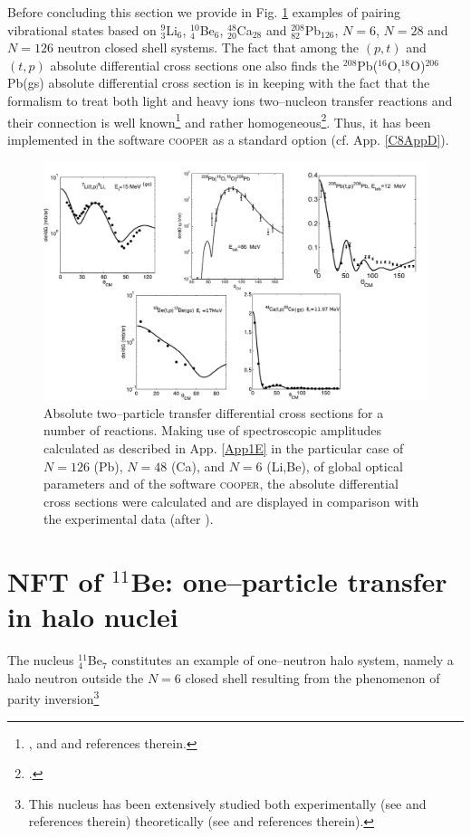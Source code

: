  
 Before concluding this section we provide in Fig. \ref{fig8_2_1} examples of pairing vibrational states based on $^9_3$Li$_6$, $^{10}_4$Be$_6$, $^{48}_{20}$Ca$_{28}$ and $^{208}_{82}$Pb$_{126}$, $N=6$, $N=28$ and $N=126$ neutron closed shell systems. The fact that among the $(p,t)$ and $(t,p)$ absolute differential cross sections one also finds the $^{208}$Pb($^{16}$O,$^{18}$O)$^{206}$Pb(gs) absolute differential cross section is in keeping with the fact that the formalism to treat both light and heavy ions two--nucleon transfer reactions and their connection is well known\footnote{\cite{Broglia:04a}, \cite{Bayman:82} and  \cite{Thompson:88} and references therein.} and rather homogeneous\footnote{\cite{Potel:13b}.}. Thus, it has been implemented in the software \textsc{cooper} as a standard option (cf. App. \ref{C8AppD}).
   \begin{figure}
   \centerline{\includegraphics*[width=12cm,angle=0]{C8/figsC8/fig8_1_5}}
   	\caption{Absolute two--particle transfer differential cross sections for a number of reactions. Making use of spectroscopic amplitudes calculated as described in App. \ref{App1E} in the particular case of $N=126$ (Pb), $N=48$ (Ca), and $N=6$ (Li,Be), of global optical parameters and of the software \textsc{cooper}, the absolute differential cross sections were calculated and are displayed in comparison with the experimental data (after \cite{Potel:13}).}\label{fig8_2_1}
   \end{figure}
 
 
 
 
 
 
 
 
\section{NFT of $^{11}$Be: one--particle transfer in halo nuclei}\label{C6S2}
 The nucleus $^{11}_4$Be$_7$ constitutes an example of one--neutron halo system, namely a halo neutron outside the $N=6$ closed shell resulting from the phenomenon of parity inversion\footnote{This nucleus has been extensively studied both experimentally (see \cite{Iwasaki:00,Fortier:99,Winfield:01,Auton:70,Zwieglinski:79,Schmitt:13,Nortershauser:09,Kwan:14}  and references therein) theoretically (see \cite{Talmi:60,Otsuka:93,Sagawa:93,Vinh:95,Gori:04,Nunes:96,Fossez:16,Hamamoto:07,Kanada:02,Calci:16,Krieger:12,Timofeyuk:99,Keeley:04,Deltuva:09,Deltuva:13,Lay:14,deDiego:14} and references therein).}
 

